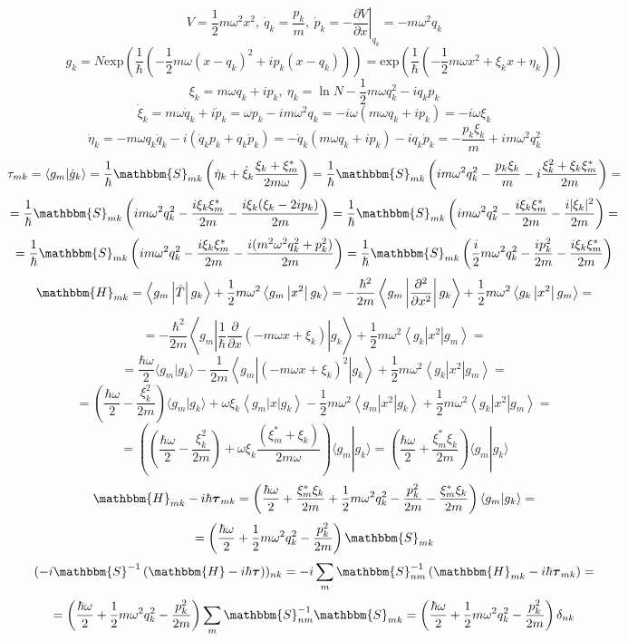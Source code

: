 \documentclass[a4paper,14pt]{extarticle}
\newcommand{\mymean}[3]{\left\langle #1 \left| #2 \right| #3 \right\rangle}
\newcommand{\myint}[2]{\langle #1 | #2 \rangle}
\newcommand{\myexp}[1]{\text{exp}\left( #1 \right)}
\begin{document}
$$V = \frac{1}{2}m\omega^2x^2,\ \dot{q}_k=\frac{p_k}{m},\ \dot{p}_k=-\left.\frac{\partial V}{\partial x}\right|_{q_k}=-m\omega^2q_k $$
$$g_k = N\myexp{\frac{1}{\hbar}\left(-\frac{1}{2}m\omega(x-q_k)^2+ip_k(x-q_k)\right)} = \myexp{\frac{1}{\hbar}\left(-\frac{1}{2}m\omega x^2 + \xi_kx + \eta_k\right)}$$
$$\xi_k = m\omega q_k + ip_k,\ \eta_k = \ln{N} - \frac{1}{2}m\omega q_k^2 - iq_kp_k$$
$$\dot{\xi}_k=m\omega\dot{q}_k+i\dot{p}_k=\omega p_k - im\omega^2q_k = -i\omega(m\omega q_k + ip_k)=-i\omega\xi_k$$
$$\dot{\eta}_k=-m\omega q_k\dot{q}_k-i(\dot{q}_kp_k+q_k\dot{p}_k)=-\dot{q}_k(m\omega q_k + ip_k)-iq_k\dot{p}_k=-\frac{p_k\xi_k}{m}+im\omega^2 q_k^2$$
$$\tau_{mk}=\myint{g_m}{\dot{g}_k}=\frac{1}{\hbar}\mathbbm{S}_{mk}\left( \dot{\eta}_k+\dot{\xi}_k\frac{\xi_k+\xi_m^*}{2m\omega}\right)=%
				   \frac{1}{\hbar}\mathbbm{S}_{mk}\left(im\omega^2 q_k^2-\frac{p_k\xi_k}{m}-i\frac{\xi_k^2+\xi_k\xi_m^*}{2m}\right)=$$
$$=\frac{1}{\hbar}\mathbbm{S}_{mk}\left(im\omega^2 q_k^2 - \frac{i\xi_k\xi_m^*}{2m} - \frac{i\xi_k(\xi_k-2ip_k)}{2m}\right)=%
   \frac{1}{\hbar}\mathbbm{S}_{mk}\left(im\omega^2 q_k^2 - \frac{i\xi_k\xi_m^*}{2m} - \frac{i|\xi_k|^2}{2m} \right)=$$
$$=\frac{1}{\hbar}\mathbbm{S}_{mk}\left(im\omega^2 q_k^2 - \frac{i\xi_k\xi_m^*}{2m} - \frac{i(m^2\omega^2q_k^2 + p_k^2)}{2m} \right)=%
   \frac{1}{\hbar}\mathbbm{S}_{mk}\left(\frac{i}{2}m\omega^2q_k^2 - \frac{ip_k^2}{2m} - \frac{i\xi_k\xi_m^*}{2m}\right)$$
$$\mathbbm{H}_{mk} = \mymean{g_m}{\hat{T}}{g_k} + \frac{1}{2}m\omega^2\mymean{g_m}{x^2}{g_k} =%
		     -\frac{\hbar^2}{2m}\mymean{g_m}{\frac{\partial^2}{\partial x^2}}{g_k} + \frac{1}{2}m\omega^2\mymean{g_k}{x^2}{g_m}=$$
$$=-\frac{\hbar^2}{2m}\mymean{g_m}{\frac{1}{\hbar}\frac{\partial}{\partial x} (-m\omega x + \xi_k)}{g_k} + \frac{1}{2}m\omega^2\mymean{g_k}{x^2}{g_m}=$$
$$=\frac{\hbar\omega}{2}\myint{g_m}{g_k} - \frac{1}{2m}\mymean{g_m}{(-m\omega x + \xi_k)^2}{g_k} + \frac{1}{2}m\omega^2\mymean{g_k}{x^2}{g_m}=$$
$$=\left(\frac{\hbar\omega}{2}-\frac{\xi_k^2}{2m}\right)\myint{g_m}{g_k}+\omega\xi_k\mymean{g_m}{x}{g_k}-%
	 \frac{1}{2}m\omega^2\mymean{g_m}{x^2}{g_k} + \frac{1}{2}m\omega^2\mymean{g_k}{x^2}{g_m}=$$
$$=\left(\left(\frac{\hbar\omega}{2}-\frac{\xi_k^2}{2m}\right)+\omega\xi_k\frac{(\xi_m^*+\xi_k)}{2m\omega}\right)\myint{g_m}{g_k}=%
   \left(\frac{\hbar\omega}{2}+\frac{\xi_m^*\xi_k}{2m}\right)\myint{g_m}{g_k}$$
$$\mathbbm{H}_{mk} - i\hbar\boldsymbol{\tau}_{mk} = \left( \frac{\hbar\omega}{2} + \frac{\xi_m^*\xi_k}{2m} + %
							   \frac{1}{2}m\omega^2q_k^2- \frac{p_k^2}{2m} -\frac{\xi_m^*\xi_k}{2m} \right)\myint{g_m}{g_k}=$$
$$=\left( \frac{\hbar\omega}{2} + \frac{1}{2}m\omega^2q_k^2 - \frac{p_k^2}{2m} \right)\mathbbm{S}_{mk}$$
$$( -i\mathbbm{S}^{-1}\left(\mathbbm{H}-i\hbar\boldsymbol{\tau}\right) )_{nk} = %
    -i\sum_m \mathbbm{S}^{-1}_{nm}\left( \mathbbm{H}_{mk} - i\hbar\boldsymbol{\tau}_{mk} \right) = $$
$$=\left( \frac{\hbar\omega}{2} +\frac{1}{2}m\omega^2q_k^2 - \frac{p_k^2}{2m} \right)\sum_m\mathbbm{S}^{-1}_{nm}\mathbbm{S}_{mk} = %
   \left( \frac{\hbar\omega}{2} +\frac{1}{2}m\omega^2q_k^2 - \frac{p_k^2}{2m} \right)\delta_{nk}$$
\end{document}

